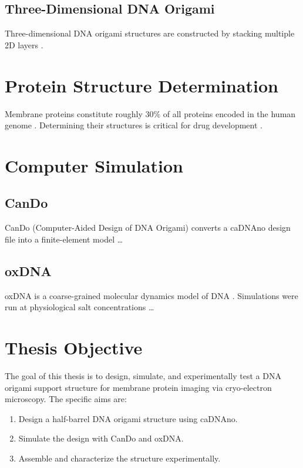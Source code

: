 \subsection{Three-Dimensional DNA Origami}
\label{subsec:3d-dna-origami}

Three-dimensional DNA origami structures are constructed by stacking multiple
2D layers \cite{douglasRapidPrototyping2009}.


\section{Protein Structure Determination}
\label{sec:protein-structure}

Membrane proteins constitute roughly 30\% of all proteins encoded in the human
genome \cite{proteinGenomeKey}.  Determining their structures is critical for
drug development \cite{drugDevKey}.


\section{Computer Simulation}
\label{sec:computer-simulation}

\subsection{CanDo}
\label{subsec:cando}

CanDo (Computer-Aided Design of DNA Origami) \cite{candoKey} converts a
caDNAno design file into a finite-element model \ldots

\subsection{oxDNA}
\label{subsec:oxdna}

oxDNA is a coarse-grained molecular dynamics model of DNA \cite{oxdnaKey}.
Simulations were run at physiological salt concentrations \ldots


\section{Thesis Objective}
\label{sec:thesis-objective}

The goal of this thesis is to design, simulate, and experimentally test a DNA
origami support structure for membrane protein imaging via cryo-electron
microscopy.  The specific aims are:
\begin{enumerate}
  \item Design a half-barrel DNA origami structure using caDNAno.
  \item Simulate the design with CanDo and oxDNA.
  \item Assemble and characterize the structure experimentally.
\end{enumerate}
